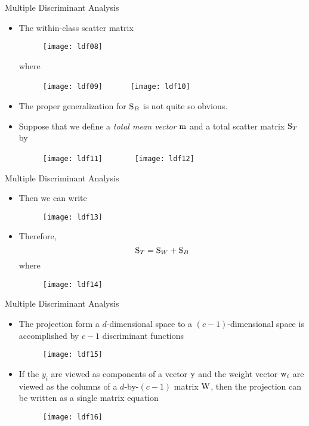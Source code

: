 \begin{frame}{Multiple Discriminant Analysis}
\begin{itemize}
\item The within-class scatter matrix
\begin{figure}
\texttt{[image: ldf08]}
\end{figure}
where\\
\begin{figure}
\texttt{[image: ldf09]}~~~~~~
\texttt{[image: ldf10]}
\end{figure}
\item The proper generalization for ${\rm S}_B$ is not quite so obvious.
\item Suppose that we define a \textit{\color{mycolor2}total mean vector} ${\rm m}$ and a total scatter matrix ${\rm S}_T$ by
\begin{figure}
\texttt{[image: ldf11]}~~~~~~~
\texttt{[image: ldf12]}
\end{figure}
\end{itemize}
\end{frame}

\begin{frame}{Multiple Discriminant Analysis}
\begin{itemize}
\item Then we can write
\begin{figure}
\texttt{[image: ldf13]}
\end{figure}
\item Therefore,
\begin{equation}
{\rm S}_T={\rm S}_{W}+{\rm S}_{B}\nonumber
\end{equation}
where 
\begin{figure}
\texttt{[image: ldf14]}
\end{figure}
\end{itemize}
\end{frame}

\begin{frame}{Multiple Discriminant Analysis}
\begin{itemize}
\item The projection form a $d$-dimensional space to a $(c-1)$-dimensional space is accomplished by $c-1$ discriminant functions
\begin{figure}
\texttt{[image: ldf15]}
\end{figure}
\item If the $y_i$ are viewed as components of a vector ${\rm y}$ and the weight vector ${\rm w}_i$ are viewed as the columns of a $d$-by-$(c-1)$ matrix ${\rm W}$, then the projection can be written as a single matrix equation
\begin{figure}
\texttt{[image: ldf16]}
\end{figure}
\end{itemize}
\end{frame}

